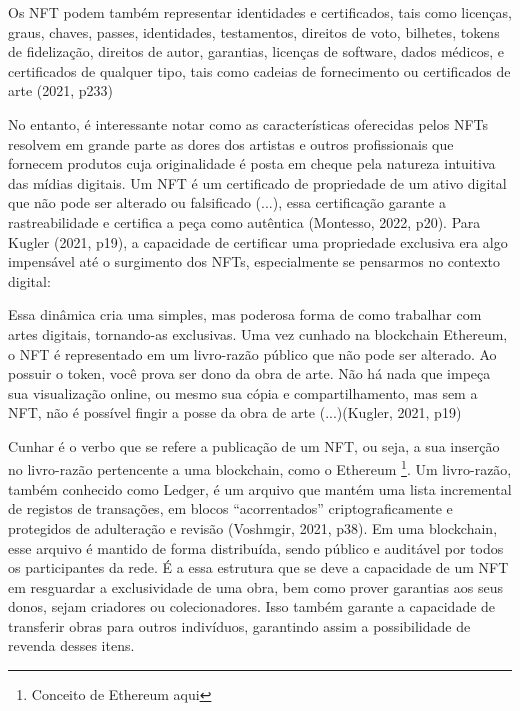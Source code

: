 \begin{citacao}
	 Os NFT podem também representar identidades e certificados, tais como licenças, graus, chaves, passes, identidades, testamentos, direitos de voto, bilhetes, tokens de fidelização, direitos de autor, garantias, licenças de software, dados médicos, e certificados de qualquer tipo, tais como cadeias de fornecimento ou certificados de arte (2021, p233)	
\end{citacao}

No entanto, é interessante notar como as características oferecidas pelos NFTs resolvem em grande parte as dores dos artistas e outros profissionais que fornecem produtos cuja originalidade é posta em cheque pela natureza intuitiva das mídias digitais. Um NFT é um certificado de propriedade de um ativo digital que não pode ser alterado ou falsificado (...), essa certificação garante a rastreabilidade e certifica a peça como autêntica (Montesso, 2022, p20). Para Kugler (2021, p19), a capacidade de certificar uma propriedade exclusiva era algo impensável até o surgimento dos NFTs, especialmente se pensarmos no contexto digital: 

\begin{citacao}
Essa dinâmica cria uma simples, mas poderosa forma de como trabalhar com artes digitais, tornando-as exclusivas. Uma vez cunhado na blockchain Ethereum, o NFT é representado em um livro-razão público que não pode ser alterado. Ao possuir o token, você prova ser dono da obra de arte. Não há nada que impeça sua visualização online, ou mesmo sua cópia e compartilhamento, mas sem a NFT, não é possível fingir a posse da obra de arte (...)(Kugler, 2021, p19)	
\end{citacao}

Cunhar é o verbo que se refere a publicação de um NFT, ou seja, a sua inserção no livro-razão pertencente a uma blockchain, como o Ethereum \footnote{Conceito de Ethereum aqui}. Um livro-razão, também conhecido como Ledger, é um arquivo que mantém uma lista incremental de registos de transações, em blocos “acorrentados” criptograficamente e protegidos de adulteração e revisão (Voshmgir, 2021, p38). Em uma blockchain, esse arquivo é mantido de forma distribuída, sendo público e auditável por todos os participantes da rede. É a essa estrutura que se deve a capacidade de um NFT em resguardar a exclusividade de uma obra, bem como prover garantias aos seus donos, sejam criadores ou colecionadores. Isso também garante a capacidade de transferir obras para outros indivíduos, garantindo assim a possibilidade de revenda desses itens.

